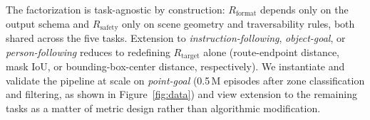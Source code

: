 The factorization is task-agnostic by construction: $R_{\mathrm{format}}$ depends only on the output schema and $R_{\mathrm{safety}}$ only on scene geometry and traversability rules, both shared across the five tasks. Extension to \textit{instruction-following}, \textit{object-goal}, or \textit{person-following} reduces to redefining $R_{\mathrm{target}}$ alone (route-endpoint distance, mask IoU, or bounding-box-center distance, respectively). We instantiate and validate the pipeline at scale on  \textit{point-goal} (0.5\,M episodes after zone classification and filtering, as shown in Figure~\ref{fig:data}) and view extension to the remaining tasks as a matter of metric design rather than algorithmic modification.
